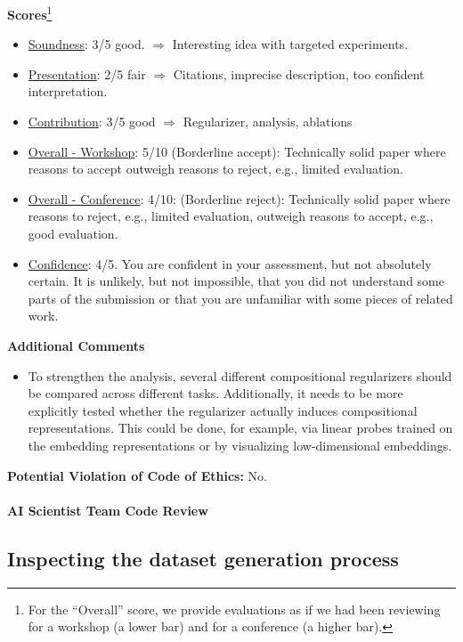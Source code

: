 \textbf{Scores}\footnote{For the ``Overall'' score, we provide evaluations as if we had been reviewing for a workshop (a lower bar) and for a conference (a higher bar).}
\begin{itemize}
    \item \underline{Soundness}: 3/5 good. $\Rightarrow$ Interesting idea with targeted experiments.
    \item \underline{Presentation}: 2/5 fair $\Rightarrow$ Citations, imprecise description, too confident interpretation.
    \item \underline{Contribution}: 3/5 good $\Rightarrow$ Regularizer, analysis, ablations
    \item \underline{Overall - Workshop}: 5/10 (Borderline accept): Technically solid paper where reasons to accept outweigh reasons to reject, e.g., limited evaluation.
    \item \underline{Overall - Conference}: 4/10: (Borderline reject): Technically solid paper where reasons to reject, e.g., limited evaluation, outweigh reasons to accept, e.g., good evaluation.
    \item \underline{Confidence}: 4/5. You are confident in your assessment, but not absolutely certain. It is unlikely, but not impossible, that you did not understand some parts of the submission or that you are unfamiliar with some pieces of related work.
\end{itemize}


\textbf{Additional Comments}
\begin{itemize}
    \item To strengthen the analysis, several different compositional regularizers should be compared across different tasks. Additionally, it needs to be more explicitly tested whether the regularizer actually induces compositional representations. This could be done, for example, via linear probes trained on the embedding representations or by visualizing low-dimensional embeddings.
\end{itemize}

\textbf{Potential Violation of Code of Ethics:} No.\\

\paragraph{AI Scientist Team Code Review}

\subsection*{Inspecting the dataset generation process}

